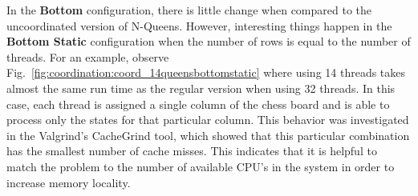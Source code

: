 In the \textbf{Bottom} configuration, there is little change when compared to
the uncoordinated version of N-Queens. However, interesting things happen in the
\textbf{Bottom Static} configuration when the number of rows is equal to the
number of threads. For an example, observe
Fig.~\ref{fig:coordination:coord_14queensbottomstatic} where using 14 threads
takes almost the same run time as the regular version when using 32 threads.  In
this case, each thread is assigned a single column of the chess board and is
able to process only the states for that particular column. This behavior was
investigated in the Valgrind's CacheGrind tool, which showed that this
particular combination has the smallest number of cache misses. This indicates
that it is helpful to match the problem to the number of available CPU's in the
system in order to increase memory locality.


